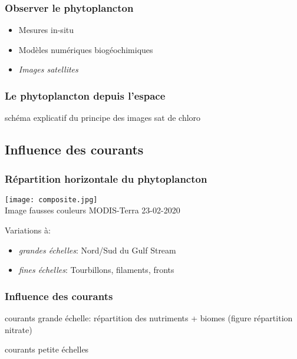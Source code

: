 \begin{frame}
  \frametitle{Observer le phytoplancton}
  {
    \centering
  }

  \begin{itemize}
    \item<2-> Mesures in-situ
    \item<3-> Modèles numériques biogéochimiques
    \item<4-> \emph{Images satellites}
  \end{itemize}
\end{frame}


\begin{frame}
  \frametitle{Le phytoplancton depuis l'espace}
  schéma explicatif du principe des images sat de chloro
\end{frame}


\subsection{Influence des courants}

\begin{frame}
  \frametitle{Répartition horizontale du phytoplancton}
  \begin{beamercolorbox}[sep=0pt, right]{}
    \texttt{[image: composite.jpg]}
    \\
    {\footnotesize Image fausses couleurs MODIS-Terra 23-02-2020}
  \end{beamercolorbox}

  \vfill

  \begin{beamercolorbox}[sep=0pt]{}
    Variations à:
    \begin{itemize}[<+->]
      \item \emph{grandes échelles}: Nord/Sud du Gulf Stream
      \item \emph{fines échelles}: Tourbillons, filaments, \alert{fronts}
    \end{itemize}
  \end{beamercolorbox}
\end{frame}


\begin{frame}
  \frametitle{Influence des courants}
  courants grande échelle: répartition des nutriments + biomes (figure répartition nitrate)

  courants petite échelles
\end{frame}

